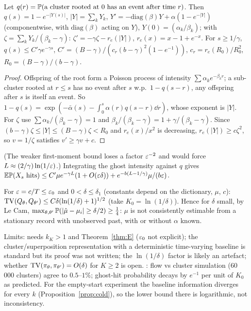 \begin{lemma}\label{lem:S}\Pt{}
Let $q(r)=\P(\text{a cluster rooted at }0\text{ has an event after time }r)$. Then $q(s)=1-e^{-|Y(s)|}$, $|Y|=\sum_kY_k$, $Y'=-\mathrm{diag}(\beta)Y+\alpha(1-e^{-|Y|})$ (componentwise, with $\mathrm{diag}(\beta)$ acting on $Y$), $Y(0)=(\alpha_k/\beta_k)$; with $\zeta=\sum_kY_k/(\beta_k-\gamma)$: $\zeta'=-\gamma\zeta-r_e(|Y|)$, $r_e(x)=x-1+e^{-x}$. For $s\ge1/\gamma$,
$q(s)\le C'\gamma e^{-\gamma s}$, $C'=(B-\gamma)/(c_r(b-\gamma)^2(1-e^{-1}))$, $c_r=r_e(R_0)/R_0^2$, $R_0=(B-\gamma)/(b-\gamma)$.
\end{lemma}
\begin{proof}
Offspring of the root form a Poisson process of intensity $\sum\alpha_ke^{-\beta_kr}$; a sub-cluster rooted at $r\le s$ has no event after $s$ w.p.\ $1-q(s-r)$, any offspring after $s$ is itself an event. So $1-q(s)=\exp(-\bar\alpha(s)-\int_0^s\alpha(r)q(s-r)\dd r)$, whose exponent is $|Y|$. For $\zeta$ use $\sum\alpha_k/(\beta_k-\gamma)=1$ and $\beta_k/(\beta_k-\gamma)=1+\gamma/(\beta_k-\gamma)$. Since $(b-\gamma)\zeta\le|Y|\le(B-\gamma)\zeta<R_0$ and $r_e(x)/x^2$ is decreasing, $r_e(|Y|)\ge c\zeta^2$, so $v=1/\zeta$ satisfies $v'\ge\gamma v+c$.
\end{proof}
(The weaker first-moment bound loses a factor $\eps^{-2}$ and would force $L\approx(2/\gamma)\ln(1/\eps)$.) Integrating the ghost intensity against $q$ gives $\E\P(X_s\text{ hits})\le C'\mu e^{-\gamma L}(1+O(\eps\delta))+e^{-b(L-1/\gamma)}\mu/(b\eps)$.

\begin{theorem}\label{thm:V}\Ps{}
For $\eps=c/T\le\eps_0$ and $0<\delta\le\delta_1$ (constants depend on the dictionary, $\mu$, $c$): $\TV(Q_\theta,Q_{\theta'})\le C\delta(\ln(1/\delta)+1)^{1/2}$ (take $K_0=\ln(1/\delta)$). Hence for $\delta$ small, by Le Cam, $\max_{\theta,\theta'}\P(|\hat\mu-\mu_i|\ge\delta/2)\ge\frac14$: $\mu$ is not consistently estimable from a stationary record with unobserved past, with or without $\alpha$ known.
\end{theorem}
Limits: needs $k_K>1$ and Theorem~\ref{thm:E} ($\eps_0$ not explicit); the cluster/superposition representation with a deterministic time-varying baseline is standard but its proof was not written; the $\ln(1/\delta)$ factor is likely an artefact; whether $\TV(\pi_\theta,\pi_{\theta'})=O(\delta)$ for $K\ge2$ is open. \Nt{}: flow vs cluster simulation (60\,000 clusters) agree to $0.5$--$1\%$; ghost-hit probability decays by $e^{-1}$ per unit of $K_0$ as predicted.
For the empty-start experiment the baseline information diverges for every $k$ (Proposition~\ref{prop:cold}), so the lower bound there is logarithmic, not inconsistency.
